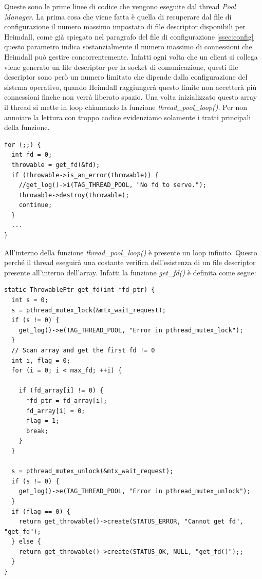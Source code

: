 \documentclass[italian]{tktltiki2}
\begin{document}
Queste sono le prime linee di codice che vengono eseguite dal thread \emph{Pool Manager}. La prima cosa che viene fatta è quella di recuperare dal file di configurazione il numero massimo impostato di file descriptor disponibili per Heimdall, come già spiegato nel paragrafo del file di configurazione \ref{ssec:config} questo parametro indica sostanzialmente il numero massimo di connessioni che Heimdall può gestire concorrentemente. Infatti ogni volta che un client si collega viene generato un file descriptor per la socket di comunicazione, questi file descriptor sono però un numero limitato che dipende dalla configurazione del sistema operativo, quando Heimdall raggiungerà questo limite non accetterà più connessioni finche non verrà liberato spazio. Una volta inizializzato questo array il thread si mette in loop chiamando la funzione \emph{thread\_pool\_loop()}. Per non annoiare la lettura con troppo codice evidenziamo solamente i tratti principali della funzione.
\begin{lstlisting}
for (;;) {
  int fd = 0;
  throwable = get_fd(&fd);
  if (throwable->is_an_error(throwable)) {
    //get_log()->i(TAG_THREAD_POOL, "No fd to serve.");
    throwable->destroy(throwable);
    continue;
  }
  ...
}
\end{lstlisting}
All'interno della funzione \emph{thread\_pool\_loop()} è presente un loop infinito. Questo perché il thread eseguirà una costante verifica dell'esistenza di un file descriptor presente all'interno dell'array. Infatti la funzione \emph{get\_fd()} è definita come segue:
\begin{lstlisting}
static ThrowablePtr get_fd(int *fd_ptr) {
  int s = 0;
  s = pthread_mutex_lock(&mtx_wait_request);
  if (s != 0) {
    get_log()->e(TAG_THREAD_POOL, "Error in pthread_mutex_lock");
  }
  // Scan array and get the first fd != 0
  int i, flag = 0;
  for (i = 0; i < max_fd; ++i) {

    if (fd_array[i] != 0) {
      *fd_ptr = fd_array[i];
      fd_array[i] = 0;
      flag = 1;
      break;
    }
  }

  s = pthread_mutex_unlock(&mtx_wait_request); 
  if (s != 0) {
    get_log()->e(TAG_THREAD_POOL, "Error in pthread_mutex_unlock");
  }
  if (flag == 0) {
    return get_throwable()->create(STATUS_ERROR, "Cannot get fd", "get_fd");
  } else {
    return get_throwable()->create(STATUS_OK, NULL, "get_fd()");;
  }
}
\end{lstlisting}
\end{document}
